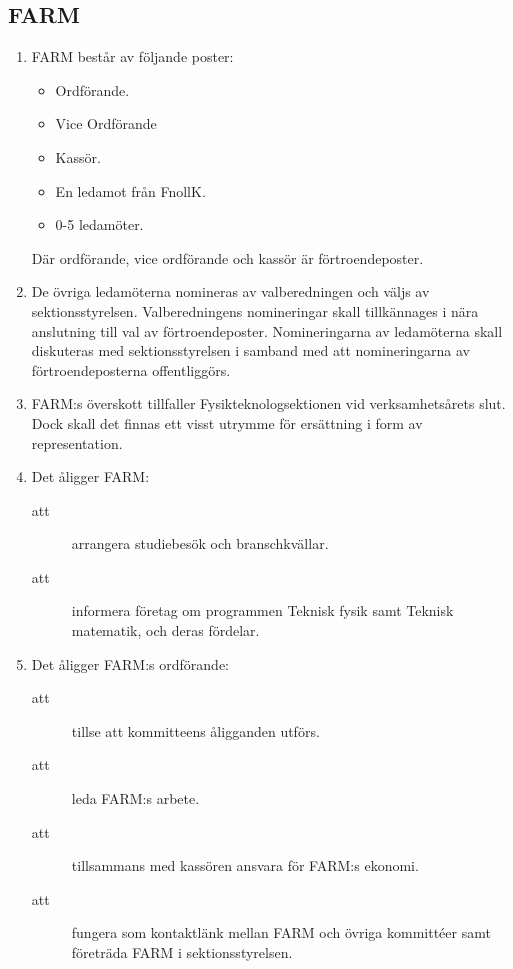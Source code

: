 \documentclass[11pt,a4paper]{article}
\begin{document}
\subsection{FARM}

\begin{enumerate}[\thesubsection .1]

  \item FARM består av följande poster:
    \begin{itemize}
	 \item Ordförande.
         \item Vice Ordförande
	 \item Kassör.
	 \item En ledamot från FnollK.
	 \item 0-5 ledamöter.
   \end{itemize}
Där ordförande, vice ordförande och kassör är förtroendeposter.

\item De övriga ledamöterna nomineras av valberedningen och väljs av sektionsstyrelsen. Valberedningens nomineringar skall tillkännages i nära anslutning till val av förtroendeposter. Nomineringarna av ledamöterna skall diskuteras med sektionsstyrelsen i samband med att nomineringarna av förtroendeposterna offentliggörs. 
 
  \item FARM:s överskott tillfaller Fysikteknologsektionen vid
  verksamhets\-årets slut. Dock skall det finnas ett visst utrymme för
  ersättning i form av representation.

  \item Det åligger FARM:
    \begin{description}
      \item[att] arrangera studiebesök och branschkvällar.   
      \item[att] informera företag om programmen Teknisk fysik samt Teknisk matematik, och deras fördelar.
    \end{description}

  \item Det åligger FARM:s ordförande:
    \begin{description}
      \item[att] tillse att kommitteens åligganden utförs.
      \item[att] leda FARM:s arbete.
      \item[att] tillsammans med kassören ansvara för FARM:s ekonomi.
      \item[att] fungera som kontaktlänk mellan FARM och övriga kommittéer samt företräda FARM i sektionsstyrelsen.
    \end{description}


\end{enumerate}
\end{document}
